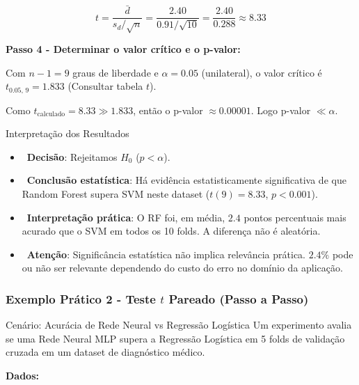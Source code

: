 \documentclass[12pt,a4paper]{article}
\begin{document}
\[
  t = \frac{\bar{d}}{s_d / \sqrt{n}} = \frac{2{.}40}{0{.}91 / \sqrt{10}} = \frac{2{.}40}{0{.}288} \approx 8{.}33
\]

\textbf{Passo 4 - Determinar o valor crítico e o p-valor:}

Com $n-1 = 9$ graus de liberdade e $\alpha = 0{.}05$ (unilateral), o valor crítico é $t_{0{.}05,\,9} = 1{.}833$ (Consultar tabela $t$).

Como $t_{\text{calculado}} = 8{.}33 \gg 1{.}833$, então o p-valor $\approx 0{.}00001$. Logo p-valor $\ll \alpha$.

\begin{exemplobox}{Interpretação dos Resultados}
\begin{itemize}
  \item {}\ \textbf{Decisão}: Rejeitamos $H_0$ ($p < \alpha$).
  \item {}\ \textbf{Conclusão estatística}: Há evidência estatisticamente significativa de que Random Forest supera SVM neste dataset ($t(9) = 8{.}33$, $p < 0{.}001$).
  \item {}\ \textbf{Interpretação prática}: O RF foi, em média, $2{.}4$ pontos percentuais mais acurado que o SVM em todos os 10 folds. A diferença não é aleatória.
  \item {}\ \textbf{Atenção}: Significância estatística não implica relevância prática. $2{.}4\%$ pode ou não ser relevante dependendo do custo do erro no domínio da aplicação.
\end{itemize}
\end{exemplobox}

\subsubsection*{Exemplo Prático 2 - Teste $t$ Pareado (Passo a Passo)}

\begin{exemplobox}{Cenário: Acurácia de Rede Neural vs Regressão Logística}
Um experimento avalia se uma Rede Neural MLP supera a Regressão Logística em 5 folds de validação cruzada em um dataset de diagnóstico médico.
\end{exemplobox}

\textbf{Dados:}
\end{document}
